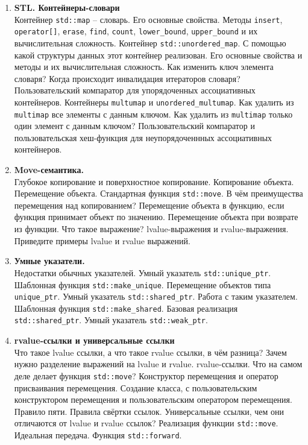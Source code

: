\documentclass{article}
\begin{document}
\begin{enumerate}
\item \textbf{STL. Контейнеры-словари}\\
Контейнер \texttt{std::map} -- словарь. Его основные свойства. Методы \texttt{insert}, \texttt{operator[]}, \texttt{erase}, \texttt{find}, \texttt{count}, \texttt{lower\_bound}, \texttt{upper\_bound} и их вычислительная сложность. Контейнер \texttt{std::unordered\_map}. С помощью какой структуры данных этот контейнер реализован. Его основные свойства и методы и их вычислительная сложность. Как изменить ключ элемента словаря?  Когда происходит инвалидация итераторов словаря? Пользовательский компаратор для упорядоченных ассоциативных контейнеров. Контейнеры \texttt{multumap} и \texttt{unordered\_multumap}. Как удалить из \texttt{multimap} все элементы с данным ключом. Как удалить из \texttt{multimap} только один элемент с данным ключом? Пользовательский компаратор и пользовательская хеш-функция для неупорядоченнных ассоциативных контейнеров.




\item \textbf{Move-семантика.}\\
Глубокое копирование и поверхностное копирование. Копирование объекта. Перемещение объекта. Стандартная функция \texttt{std::move}. В чём преимущества перемещения над копированием? Перемещение объекта в функцию, если функция принимает объект по значению. Перемещение объекта при возврате из функции. Что такое выражение? lvalue-выражения и rvalue-выражения. Приведите примеры lvalue и rvalue выражений. 

\item \textbf{Умные указатели.}\\
Недостатки обычных указателей. Умный указатель \texttt{std::unique\_ptr}. Шаблонная функция \texttt{std::make\_unique}. Перемещение объектов типа \texttt{unique\_ptr}. Умный указатель \texttt{std::shared\_ptr}. Работа с таким указателем. Шаблонная функция \texttt{std::make\_shared}. Базовая реализация \texttt{std::shared\_ptr}. Умный указатель \texttt{std::weak\_ptr}.


\item \textbf{rvalue-ссылки и универсальные ссылки}\\
Что такое lvalue ссылки, а что такое rvalue ссылки, в чём разница? Зачем нужно разделение выражений на lvalue и rvalue. rvalue-ссылки. Что на самом деле делает функция \texttt{std::move}? Конструктор перемещения и оператор присваивания перемещения. Создание класса, с пользовательским конструктором перемещения и пользовательским оператором перемещения. Правило пяти.  Правила свёртки ссылок. Универсальные ссылки, чем они отличаются от lvalue и rvalue ссылок? Реализация функции \texttt{std::move}. Идеальная передача. Функция \texttt{std::forward}.



\end{enumerate}
\end{document}
